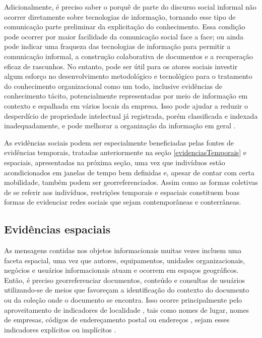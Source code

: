 Adicionalmente, é preciso saber o porquê de parte do discurso social informal não ocorrer diretamente sobre tecnologias de informação, tornando esse tipo de comunicação parte preliminar da explicitação do conhecimento. Essa condição pode ocorrer por maior facilidade da comunicação social face a face; ou ainda pode indicar uma fraqueza das tecnologias de informação para permitir a comunicação informal, a construção colaborativa de documentos e a recuperação eficaz de rascunhos. No entanto, pode ser útil para os atores sociais investir algum esforço no desenvolvimento metodológico e tecnológico para o tratamento do conhecimento organizacional como um todo, inclusive evidências de conhecimento tácito, potencialmente representadas por meio de informação em contexto e espalhada em vários locais da empresa. Isso pode ajudar a reduzir o desperdício de propriedade intelectual já registrada, porém classificada e indexada inadequadamente, e pode melhorar a organização da informação em geral \cite{chou2005}.

As evidências sociais podem ser especialmente beneficiadas pelas fontes de evidências temporais, tratadas anteriormente na seção \ref{evidenciasTemporais} e espaciais, apresentadas na próxima seção, uma vez que indivíduos estão acondicionados em janelas de tempo bem definidas e, apesar de contar com certa mobilidade, também podem ser georreferenciados. Assim como as formas coletivas de se referir aos indivíduos, restrições temporais e espaciais constituem boas formas de evidenciar redes sociais que sejam contemporâneas e conterrâneas.

\subsection{Evidências espaciais}%

As mensagens contidas nos objetos informacionais muitas vezes incluem uma faceta espacial, uma vez que autores, equipamentos, unidades organizacionais, negócios e usuários informacionais atuam e ocorrem em espaços geográficos. Então, é preciso georreferenciar documentos, conteúdo e consultas de usuários utilizando-se de meios que favoreçam a identificação do contexto do documento ou da coleção onde o documento se encontra. Isso ocorre principalmente pelo aproveitamento de indicadores de localidade \cite{leveling07}, tais como nomes de lugar, nomes de empresas, códigos de endereçamento postal ou endereços \cite{amitay04,borges07}, sejam esses indicadores explícitos ou implícitos \cite{li06}.

